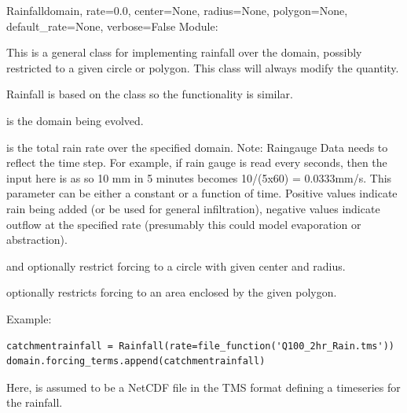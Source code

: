 \documentclass{manual}
\begin{document}
\begin{classdesc}{Rainfall}{domain,
                           rate=0.0,
                           center=None,
                           radius=None,
                           polygon=None,
                           default_rate=None,
                           verbose=False}
Module: 

This is a general class for implementing rainfall over the domain, possibly restricted to a given circle or polygon.
This class will always modify the  quantity.

Rainfall is based on the  class so the functionality is similar.

 is the domain being evolved.

 is the total rain rate over the specified domain.
Note: Raingauge Data needs to reflect the time step.
For example, if rain gauge is  read every  seconds, then the input
here is as  so 10 mm in 5 minutes becomes
10/(5x60) = 0.0333mm/s.  This parameter can be either a constant or a
function of time. Positive values indicate rain being added (or be used for general infiltration),
negative values indicate outflow at the specified rate (presumably this could model evaporation or abstraction).

 and  optionally restrict forcing to a circle with given center and radius.

 optionally restricts forcing to an area enclosed by the given polygon.

Example:

\begin{verbatim}
catchmentrainfall = Rainfall(rate=file_function('Q100_2hr_Rain.tms'))
domain.forcing_terms.append(catchmentrainfall)
\end{verbatim}

Here,  is assumed to be a NetCDF file in the TMS format defining a timeseries for the rainfall.
\end{classdesc}
\end{document}
